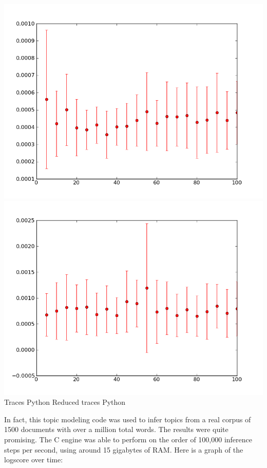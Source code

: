\documentclass[10pt]{article}
\begin{document}
\begin{center}
\includegraphics[scale=0.4]{../graphs/topic_models/topic-model-collapsed-traces-py-time.png} 
\includegraphics[scale=0.4]{../graphs/topic_models/topic-model-collapsed-reduced-traces-py-time.png} \\
Traces Python \qquad \qquad \qquad\qquad\qquad\qquad \qquad Reduced traces Python \\
\end{center}
In fact, this topic modeling code was used to infer topics from a real corpus of 1500 documents with over a million total words.  The results were quite promising.  The C engine was able to perform on the order of 100,000 inference steps per second, using around 15 gigabytes of RAM.  Here is a graph of the logscore over time:
\end{document}
